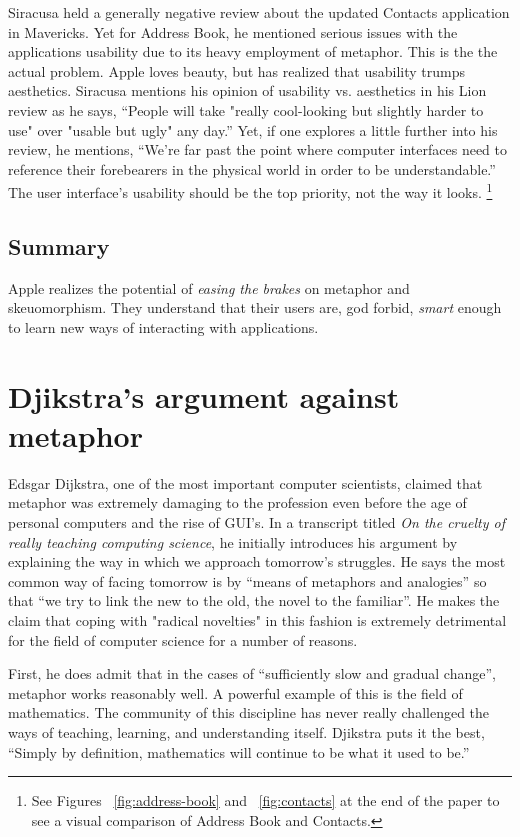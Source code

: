 \documentclass[11pt, oneside]{article}   	%
\begin{document}
Siracusa held a generally negative review about the updated Contacts application in Mavericks. Yet for Address Book, he mentioned serious issues with the applications usability due to its heavy employment of metaphor. This is the the actual problem. Apple loves beauty, but has realized that usability trumps aesthetics. Siracusa mentions his opinion of usability vs. aesthetics in his Lion review as he says, ``People will take "really cool-looking but slightly harder to use" over "usable but ugly" any day.'' Yet, if one explores a little further into his review, he mentions, ``We're far past the point where computer interfaces need to reference their forebearers in the physical world in order to be understandable.'' The user interface's usability should be the top priority, not the way it looks. \footnote{See Figures ~\ref{fig:address-book} and ~\ref{fig:contacts} at the end of the paper to see a visual comparison of Address Book and Contacts.}
 
\subsection{Summary}
Apple realizes the potential of \textit{easing the brakes} on metaphor and skeuomorphism. They understand that their users are, god forbid, \textit{smart} enough to learn new ways of interacting with applications.


\section{Djikstra's argument against metaphor}
Edsgar Dijkstra, one of the most important computer scientists, claimed that metaphor was extremely damaging to the profession even before the age of personal computers and the rise of GUI's. In a transcript titled \textit{On the cruelty of really teaching computing science}, he initially introduces his argument by explaining the way in which we approach tomorrow's struggles. He says the most common way of facing tomorrow is by ``means of metaphors and analogies'' so that ``we try to link the new to the old, the novel to the familiar''. He makes the claim that coping with "radical novelties" in this fashion is extremely detrimental for the field of computer science for a number of reasons.

First, he does admit that in the cases of ``sufficiently slow and gradual change'', metaphor works reasonably well. A powerful example of this is the field of mathematics. The community of this discipline has never really challenged the ways of teaching, learning, and understanding itself. Djikstra puts it the best, ``Simply by definition, mathematics will continue to be what it used to be.''
\end{document}
